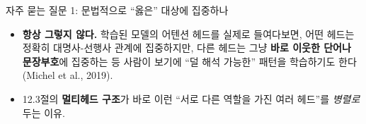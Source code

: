 \begin{frame}{자주 묻는 질문 1: 문법적으로 ``옳은'' 대상에 집중하나}
  \begin{itemize}
    \item \textbf{항상 그렇지 않다.} 학습된 모델의 어텐션 헤드를
      실제로 들여다보면, 어떤 헤드는 정확히 대명사-선행사 관계에
      집중하지만, 다른 헤드는 그냥 \textbf{바로 이웃한 단어나
      문장부호}에 집중하는 등 사람이 보기에 ``덜 해석 가능한''
      패턴을 학습하기도 한다 (Michel et al., 2019).
    \item 12.3절의 \textbf{멀티헤드 구조}가 바로 이런
      ``서로 다른 역할을 가진 여러 헤드''를 \emph{병렬로} 두는
      이유.
  \end{itemize}
\end{frame}
